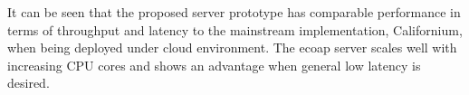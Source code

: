 It can be seen that the proposed server prototype has comparable performance in terms of throughput and latency to the mainstream implementation, Californium, when being deployed under cloud environment. The ecoap server scales well with increasing CPU cores and shows an advantage when general low latency is desired.








